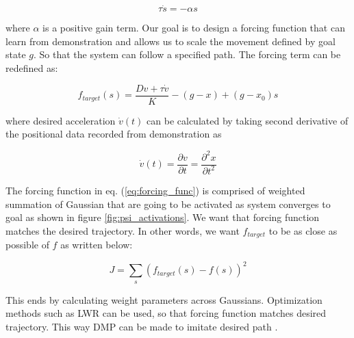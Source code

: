 \documentclass[sigconf]{acmart}
\begin{document}
\begin{equation}
	\tau \dot{s} = - \alpha s
\end{equation}

where $\alpha$ is a positive gain term. Our goal is to design a forcing function that can learn from demonstration and allows us to scale the movement defined by goal state $g$. So that the system can follow a specified path. The forcing term can be redefined as:

\begin{equation}
	f_{target}(s) = \frac{D v + \tau \dot{v}}{K} - (g - x) +  (g - x_0) s
\end{equation}

where desired acceleration $\dot{v}(t)$ can be calculated by taking second derivative of the positional data recorded from demonstration as

\begin{equation}
	\dot{v}(t) = \frac{\partial v}{\partial t} = \frac{\partial^2 x}{\partial t^2}
\end{equation}

The forcing function in eq. (\ref{eq:forcing_func}) is comprised of weighted summation of Gaussian that are going to be activated as system converges to goal as shown in figure \ref{fig:psi_activations}. We want that forcing function matches the desired trajectory. In other words, we want $f_{target}$ to be as close as possible of $f$ as written below:

\begin{equation}
	J = \sum_{s} \left( f_{target}(s) - f(s) \right)^2
\end{equation}

This ends by calculating weight parameters across Gaussians. Optimization methods such as LWR \cite{vijayakumar2000locally} can be used, so that forcing function matches desired trajectory. This way DMP can be made to imitate desired path \cite{pastor2009learning}.
\end{document}
